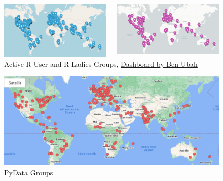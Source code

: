 \documentclass[
  ignorenonframetext,
]{beamer}
\begin{document}
\begin{frame}{}
\protect\hypertarget{section}{}
\vspace{1em}
\begin{figure}
  \begin{columns}
    \begin{column}{.5\linewidth}
\includegraphics{figs/Rusergroups.png}
    \end{column}
    \begin{column}{.5\linewidth}
\includegraphics{figs/RLadiesgroups.png}
    \end{column}
      \end{columns}
    \caption{Active R User and R-Ladies Groups, \href{https://benubah.github.io/r-community-explorer/rugs.html}{Dashboard by Ben Ubah}}
    \end{figure}
\vspace{-3em}

\begin{figure}
\centering
\includegraphics{figs/PyDatagroups.png}
\caption{PyData Groups}
\end{figure}
\end{frame}
\end{document}
